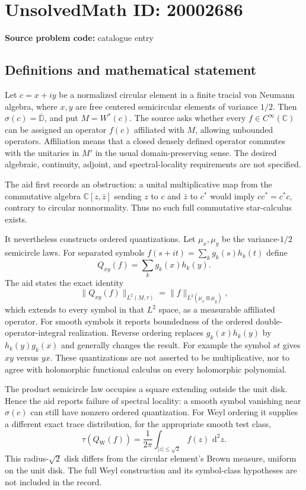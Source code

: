 \documentclass[11pt]{article}
\newcommand{\C}{\mathbb{C}}
\newcommand{\dd}{\,\mathrm{d}}
\begin{document}
\section*{UnsolvedMath ID: 20002686}
\textbf{Source problem code:} catalogue entry
\subsection{Definitions and mathematical statement}
Let $c=x+iy$ be a normalized circular element in a finite tracial von Neumann algebra, where $x,y$ are free centered semicircular elements of variance $1/2$. Then $\sigma(c)=\overline{\mathbb D}$, and put $M=W^*(c)$. The source asks whether every $f\in C^\infty(\C)$ can be assigned an operator $f(c)$ affiliated with $M$, allowing unbounded operators. Affiliation means that a closed densely defined operator commutes with the unitaries in $M'$ in the usual domain-preserving sense. The desired algebraic, continuity, adjoint, and spectral-locality requirements are not specified.

The aid first records an obstruction: a unital multiplicative map from the commutative algebra $\C[z,\bar z]$ sending $z$ to $c$ and $\bar z$ to $c^*$ would imply $cc^*=c^*c$, contrary to circular nonnormality. Thus no such full commutative star-calculus exists.

It nevertheless constructs ordered quantizations. Let $\mu_x,\mu_y$ be the variance-$1/2$ semicircle laws. For separated symbols $f(s+it)=\sum_kg_k(s)h_k(t)$ define
\[
 Q_{xy}(f)=\sum_kg_k(x)h_k(y).
\]
The aid states the exact identity
\[
 \|Q_{xy}(f)\|_{L^2(M,\tau)}
 =\|f\|_{L^2(\mu_x\otimes\mu_y)},
\]
which extends to every symbol in that $L^2$ space, as a measurable affiliated operator. For smooth symbols it reports boundedness of the ordered double-operator-integral realization. Reverse ordering replaces $g_k(x)h_k(y)$ by $h_k(y)g_k(x)$ and generally changes the result. For example the symbol $st$ gives $xy$ versus $yx$. These quantizations are not asserted to be multiplicative, nor to agree with holomorphic functional calculus on every holomorphic polynomial.

The product semicircle law occupies a square extending outside the unit disk. Hence the aid reports failure of spectral locality: a smooth symbol vanishing near $\sigma(c)$ can still have nonzero ordered quantization. For Weyl ordering it supplies a different exact trace distribution, for the appropriate smooth test class,
\[
 \tau(Q_{\mathrm W}(f))=\frac1{2\pi}\int_{|z|\le\sqrt2}f(z)\,\dd^2z.
\]
This radius-$\sqrt2$ disk differs from the circular element's Brown measure, uniform on the unit disk. The full Weyl construction and its symbol-class hypotheses are not included in the record.
\end{document}

